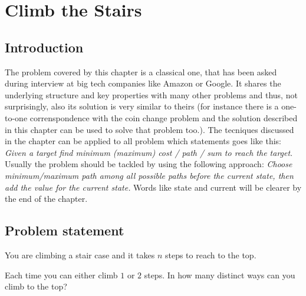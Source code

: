 %

\chapter{Climb the Stairs}
\label{ch:stairs_climbing}
\section*{Introduction}
The problem covered by this chapter is a classical one, that has been asked during interview at big tech companies like Amazon or Google. It shares the underlying structure and key properties with many other problems and thus, not surprisingly, also its solution is very similar to theirs (for instance there is a one-to-one correnspondence with the coin change problem and the solution described in this chapter can be used to solve that problem too.). The tecniques discussed in the chapter can be applied to all problem which statements goes like this: \textit{Given a target find minimum (maximum) cost / path / sum to reach the target}. Usually the problem should be tackled by using the following approach: \textit{Choose minimum/maximum path among all possible paths before the current state, then add the value for the current state.}
Words like state and current will be clearer by the end of the chapter.

\section{Problem statement}
\label{sec:stairs_climbing_statement_easy}
\begin{exercise}
You are climbing a stair case and it takes $n$ steps to reach to the top.

Each time you can either climb $1$ or $2$ steps. In how many distinct ways can you climb to the top?
\end{exercise}


